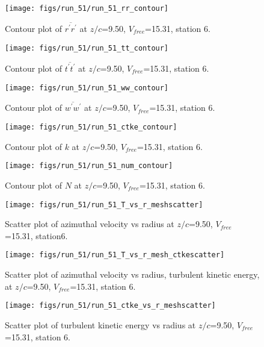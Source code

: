 \begin{figure}[H]
\centering
\texttt{[image: figs/run\_51/run\_51\_rr\_contour]}
\caption{Contour plot of $\overline{r^\prime r^\prime}$ at $z/c$=9.50, $V_{free}$=15.31, station 6.}
\label{fig:run_51_rr_contour}
\end{figure}


\begin{figure}[H]
\centering
\texttt{[image: figs/run\_51/run\_51\_tt\_contour]}
\caption{Contour plot of $\overline{t^\prime t^\prime}$ at $z/c$=9.50, $V_{free}$=15.31, station 6.}
\label{fig:run_51_tt_contour}
\end{figure}


\begin{figure}[H]
\centering
\texttt{[image: figs/run\_51/run\_51\_ww\_contour]}
\caption{Contour plot of $\overline{w^\prime w^\prime}$ at $z/c$=9.50, $V_{free}$=15.31, station 6.}
\label{fig:run_51_ww_contour}
\end{figure}


\begin{figure}[H]
\centering
\texttt{[image: figs/run\_51/run\_51\_ctke\_contour]}
\caption{Contour plot of $k$ at $z/c$=9.50, $V_{free}$=15.31, station 6.}
\label{fig:run_51_ctke_contour}
\end{figure}


\begin{figure}[H]
\centering
\texttt{[image: figs/run\_51/run\_51\_num\_contour]}
\caption{Contour plot of $N$ at $z/c$=9.50, $V_{free}$=15.31, station 6.}
\label{fig:run_51_num_contour}
\end{figure}


\begin{figure}[H]
\centering
\texttt{[image: figs/run\_51/run\_51\_T\_vs\_r\_meshscatter]}
\caption{Scatter plot of azimuthal velocity vs radius at $z/c$=9.50, $V_{free}$=15.31, station6.}
\label{fig:run_51_T_vs_r_meshscatter}
\end{figure}


\begin{figure}[H]
\centering
\texttt{[image: figs/run\_51/run\_51\_T\_vs\_r\_mesh\_ctkescatter]}
\caption{Scatter plot of azimuthal velocity vs radius, turbulent kinetic energy, at $z/c$=9.50, $V_{free}$=15.31, station 6.}
\label{fig:run_51_T_vs_r_mesh_ctkescatter}
\end{figure}


\begin{figure}[H]
\centering
\texttt{[image: figs/run\_51/run\_51\_ctke\_vs\_r\_meshscatter]}
\caption{Scatter plot of turbulent kinetic energy vs radius at $z/c$=9.50, $V_{free}$=15.31, station 6.}
\label{fig:run_51_ctke_vs_r_meshscatter}
\end{figure}


